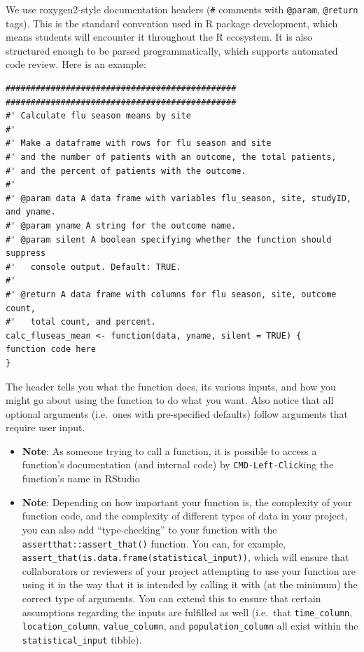 \documentclass[
]{book}
\begin{document}
We use roxygen2-style documentation headers (\texttt{\#\textquotesingle{}} comments with \texttt{@param}, \texttt{@return} tags). This is the standard convention used in R package development, which means students will encounter it throughout the R ecosystem. It is also structured enough to be parsed programmatically, which supports automated code review. Here is an example:

\begin{verbatim}
##############################################
##############################################
#' Calculate flu season means by site
#'
#' Make a dataframe with rows for flu season and site
#' and the number of patients with an outcome, the total patients,
#' and the percent of patients with the outcome.
#'
#' @param data A data frame with variables flu_season, site, studyID, and yname.
#' @param yname A string for the outcome name.
#' @param silent A boolean specifying whether the function should suppress
#'   console output. Default: TRUE.
#'
#' @return A data frame with columns for flu season, site, outcome count,
#'   total count, and percent.
calc_fluseas_mean <- function(data, yname, silent = TRUE) {
function code here
}
\end{verbatim}

The header tells you what the function does, its various inputs, and how you might go about using the function to do what you want. Also notice that all optional arguments (i.e.~ones with pre-specified defaults) follow arguments that require user input.

\begin{itemize}
\item
  \textbf{Note}: As someone trying to call a function, it is possible to access a function's documentation (and internal code) by \texttt{CMD-Left-Click}ing the function's name in RStudio
\item
  \textbf{Note}: Depending on how important your function is, the complexity of your function code, and the complexity of different types of data in your project, you can also add ``type-checking'' to your function with the \texttt{assertthat::assert\_that()} function. You can, for example, \texttt{assert\_that(is.data.frame(statistical\_input))}, which will ensure that collaborators or reviewers of your project attempting to use your function are using it in the way that it is intended by calling it with (at the minimum) the correct type of arguments. You can extend this to ensure that certain assumptions regarding the inputs are fulfilled as well (i.e.~that \texttt{time\_column}, \texttt{location\_column}, \texttt{value\_column}, and \texttt{population\_column} all exist within the \texttt{statistical\_input} tibble).
\end{itemize}
\end{document}
